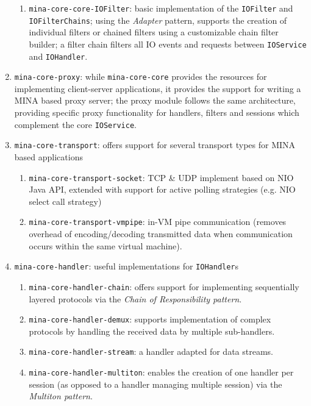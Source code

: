 \begin{enumerate}
\begin{enumerate}
            \item \texttt{mina-core-core-IOFilter}: basic implementation of the \texttt{IOFilter} and \texttt{IOFilterChains}; using the \textit{Adapter} pattern, supports the creation of individual filters or chained filters using a customizable chain filter builder; a filter chain filters all IO events and requests between \texttt{IOService} and \texttt{IOHandler}.
        \end{enumerate}
    \item \texttt{mina-core-proxy}: while \texttt{mina-core-core} provides the resources for implementing client-server applications, it provides the support for writing a MINA based proxy server; the proxy module follows the same architecture, providing specific proxy functionality for handlers, filters and sessions which complement the core \texttt{IOService}.
    \item \texttt{mina-core-transport}: offers support for several transport types for MINA based applications
        \begin{enumerate}
            \item \texttt{mina-core-transport-socket}: TCP \& UDP implement based on NIO Java API, extended with support for active polling strategies (e.g. NIO select call strategy)
            \item \texttt{mina-core-transport-vmpipe}: in-VM pipe communication (removes overhead of encoding/decoding transmitted data when communication occurs within the same virtual machine).
        \end{enumerate} 
    \item \texttt{mina-core-handler}: useful implementations for \texttt{IOHandler}s
        \begin{enumerate}
            \item \texttt{mina-core-handler-chain}: offers support for implementing sequentially layered protocols via the \textit{Chain of Responsibility pattern}.
            \item \texttt{mina-core-handler-demux}: supports implementation of complex protocols by handling the received data by multiple sub-handlers.
            \item \texttt{mina-core-handler-stream}: a handler adapted for data streams.
            \item \texttt{mina-core-handler-multiton}: enables the creation of one handler per session (as opposed to a handler managing multiple session) via the \textit{Multiton pattern}.
        \end{enumerate}

\end{enumerate}

